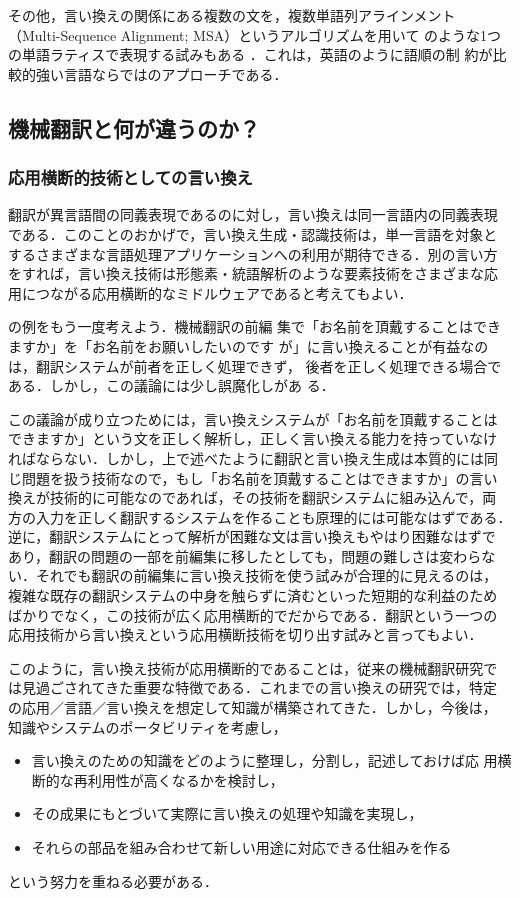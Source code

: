 その他，言い換えの関係にある複数の文を，複数単語列アラインメント
（Multi-Sequence Alignment; MSA）というアルゴリズムを用いて
のような1つの単語ラティスで表現する試みもある
\cite{barzilay:02,barzilay:03:a,pang:03}．これは，英語のように語順の制
約が比較的強い言語ならではのアプローチである．

\subsection{機械翻訳と何が違うのか？}
\label{ssec:vsMT}

\subsubsection{応用横断的技術としての言い換え}

翻訳が異言語間の同義表現であるのに対し，言い換えは同一言語内の同義表現
である．このことのおかげで，言い換え生成・認識技術は，単一言語を対象と
するさまざまな言語処理アプリケーションへの利用が期待できる．別の言い方
をすれば，言い換え技術は形態素・統語解析のような要素技術をさまざまな応
用につながる応用横断的なミドルウェアであると考えてもよい．

の例をもう一度考えよう．機械翻訳の前編
集で「お名前を頂戴することはできますか」を「お名前をお願いしたいのです
が」に言い換えることが有益なのは，翻訳システムが前者を正しく処理できず，
後者を正しく処理できる場合である．しかし，この議論には少し誤魔化しがあ
る．

この議論が成り立つためには，言い換えシステムが「お名前を頂戴することは
できますか」という文を正しく解析し，正しく言い換える能力を持っていなけ
ればならない．しかし，上で述べたように翻訳と言い換え生成は本質的には同
じ問題を扱う技術なので，もし「お名前を頂戴することはできますか」の言い
換えが技術的に可能なのであれば，その技術を翻訳システムに組み込んで，両
方の入力を正しく翻訳するシステムを作ることも原理的には可能なはずである．
逆に，翻訳システムにとって解析が困難な文は言い換えもやはり困難なはずで
あり，翻訳の問題の一部を前編集に移したとしても，問題の難しさは変わらな
い．それでも翻訳の前編集に言い換え技術を使う試みが合理的に見えるのは，
複雑な既存の翻訳システムの中身を触らずに済むといった短期的な利益のため
ばかりでなく，この技術が広く応用横断的でだからである．翻訳という一つの
応用技術から言い換えという応用横断技術を切り出す試みと言ってもよい．

このように，言い換え技術が応用横断的であることは，従来の機械翻訳研究で
は見過ごされてきた重要な特徴である．これまでの言い換えの研究では，特定
の応用／言語／言い換えを想定して知識が構築されてきた．しかし，今後は，
知識やシステムのポータビリティを考慮し，
\begin{itemize}
\item 言い換えのための知識をどのように整理し，分割し，記述しておけば応
用横断的な再利用性が高くなるかを検討し，
\item その成果にもとづいて実際に言い換えの処理や知識を実現し，
\item それらの部品を組み合わせて新しい用途に対応できる仕組みを作る
\end{itemize}
という努力を重ねる必要がある．

